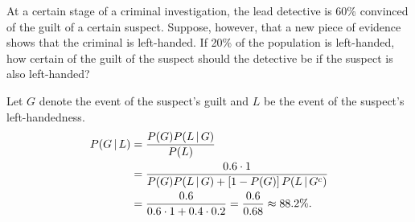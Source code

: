 \begin{changebar}
    \begin{example}
        At a certain stage of a criminal investigation, the lead detective is 60\% convinced of the guilt of a certain suspect. Suppose, however, that a new piece of evidence shows that the criminal is left-handed. If 20\% of the population is left-handed, how certain of the guilt of the suspect should the detective be if the suspect is also left-handed? 
    \end{example}
    \begin{solution}
        Let $G$ denote the event of the suspect's guilt and $L$ be the event of the suspect's left-handedness. \[
            \begin{aligned}
                P(G \,\vert\, L) &= \frac{P(G)P(L \,\vert\, G)}{P(L)} \\
                &= \frac{0.6\cdot 1}{P(G)P(L \,\vert\, G) + \left[ 1 - P(G) \right]P(L \,\vert\, G^c)} \\
                &= \frac{0.6}{0.6\cdot1 + 0.4\cdot 0.2} = \frac{0.6}{0.68} \approx 88.2\%.
            \end{aligned}    
        \]
    \end{solution}
\end{changebar}

